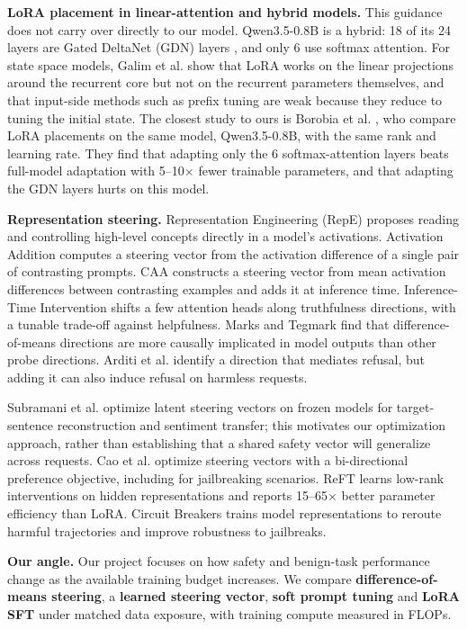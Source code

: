 \documentclass{article}
\begin{document}
\textbf{LoRA placement in linear-attention and hybrid models.} This guidance does not carry over directly to our model. Qwen3.5-0.8B is a hybrid: 18 of its 24 layers are Gated DeltaNet (GDN) layers \cite{ref17}, and only 6 use softmax attention. For state space models, Galim et al. \cite{ref21} show that LoRA works on the linear projections around the recurrent core but not on the recurrent parameters themselves, and that input-side methods such as prefix tuning are weak because they reduce to tuning the initial state. The closest study to ours is Borobia et al. \cite{ref22}, who compare LoRA placements on the same model, Qwen3.5-0.8B, with the same rank and learning rate. They find that adapting only the 6 softmax-attention layers beats full-model adaptation with 5--10\(\times\) fewer trainable parameters, and that adapting the GDN layers hurts on this model.

\textbf{Representation steering.} Representation Engineering (RepE) \cite{ref6} proposes reading and controlling high-level concepts directly in a model's activations. Activation Addition \cite{ref29} computes a steering vector from the activation difference of a single pair of contrasting prompts. CAA \cite{ref7} constructs a steering vector from mean activation differences between contrasting examples and adds it at inference time. Inference-Time Intervention \cite{ref30} shifts a few attention heads along truthfulness directions, with a tunable trade-off against helpfulness. Marks and Tegmark \cite{ref31} find that difference-of-means directions are more causally implicated in model outputs than other probe directions. Arditi et al. \cite{ref8} identify a direction that mediates refusal, but adding it can also induce refusal on harmless requests.

Subramani et al. \cite{ref9} optimize latent steering vectors on frozen models for target-sentence reconstruction and sentiment transfer; this motivates our optimization approach, rather than establishing that a shared safety vector will generalize across requests. Cao et al. \cite{ref32} optimize steering vectors with a bi-directional preference objective, including for jailbreaking scenarios. ReFT \cite{ref33} learns low-rank interventions on hidden representations and reports 15--65\(\times\) better parameter efficiency than LoRA. Circuit Breakers \cite{ref10} trains model representations to reroute harmful trajectories and improve robustness to jailbreaks.

\textbf{Our angle.} Our project focuses on how safety and benign-task performance change as the available training budget increases. We compare \textbf{difference-of-means steering}, a \textbf{learned steering vector}, \textbf{soft prompt tuning} and \textbf{LoRA SFT} under matched data exposure, with training compute measured in FLOPs.
\end{document}
